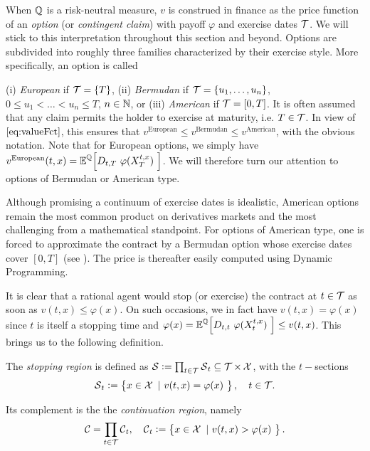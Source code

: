When $\operatorname{\mathbb{Q}}$ is a risk-neutral measure, $v$ is construed in finance as the price function of an \textit{option}  (or \textit{contingent claim}) with payoff $\varphi$ and exercise dates $\operatorname{\mathcal{T}}$. We will stick to this interpretation throughout this section and beyond.
Options are subdivided into roughly three families  characterized by their exercise style. More specifically, an option is called 

(i) \textit{European} if $\operatorname{\mathcal{T}} = \{T\}$, (ii) \textit{Bermudan} if $\operatorname{\mathcal{T}} = \{u_1,\ldots,u_n\}$, $0\le u_1 < \ldots < u_n \le T $, $n\in \operatorname{\mathbb{N}}$, or (iii) \textit{American} if $\operatorname{\mathcal{T}} = [0,T]$. It is often assumed that any claim permits the holder to exercise at maturity, i.e. $T\in \operatorname{\mathcal{T}}$. In view of $\eqref{eq:valueFct}$, this ensures  that $v^{\text{European}} \le v^{\text{Bermudan}} \le v^{\text{American}} $, with the obvious notation.  Note that for European options, we simply have $v^{\text{European}}(t,x)= \operatorname{\mathbb{E}}^{\operatorname{\mathbb{Q}}}\! \left[ D_{t,T}\ \varphi(X^{t,x}_T)\ \right]$. We will therefore turn our attention to options of Bermudan or American type.

Although promising a continuum of exercise dates is idealistic, American options remain the most common product on derivatives markets and the most challenging from a mathematical standpoint. For options of American type, one is  forced to approximate the contract by a Bermudan option whose exercise dates cover $[0,T]$ (see \citet{Guyon}). The price is thereafter easily computed using Dynamic Programming. 

It is clear that a rational agent would stop (or exercise) the contract at  $t\in \operatorname{\mathcal{T}}$ 
as soon as $v(t,x) \le \varphi(x)$. On such occasions, we in fact have $v(t,x) = \varphi(x)$ since $t$ is itself a stopping time and $\varphi(x) = \operatorname{\mathbb{E}}^{\operatorname{\mathbb{Q}}}\! \left[ D_{t,t}\ \varphi(X^{t,x}_t)\ \right] \le v(t,x)$. 
This brings us to the following definition. 
\begin{definition}
The \textit{stopping region} is defined as $\operatorname{\mathcal{S}} := \prod_{t\in \operatorname{\mathcal{T}}} \operatorname{\mathcal{S}}_t \subseteq \operatorname{\mathcal{T}} \times \operatorname{\mathcal{X}}$, with  the  $t-$sections 
\begin{equation}\label{eq:stopRegion}
    \operatorname{\mathcal{S}}_t:= \left\{ x \in \operatorname{\mathcal{X}}\ | \
v(t,x)=\varphi(x)\ \right\}, \quad t\in \operatorname{\mathcal{T}}\!.
\end{equation}

Its complement 
is the 
the \textit{continuation region}, namely
$$\operatorname{\mathcal{C}} =\prod_{t\in \operatorname{\mathcal{T}}} \operatorname{\mathcal{C}}_t, \quad \operatorname{\mathcal{C}}_t:= \left\{ x \in \operatorname{\mathcal{X}}\ | \
v(t,x) > \varphi(x)\ \right\}. $$
\end{definition}

